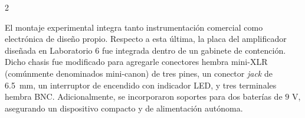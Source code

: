 \documentclass[11pt, letterpaper]{article}
\begin{document}
\begin{multicols*}{2}

El montaje experimental integra tanto instrumentación comercial como electrónica de diseño propio. Respecto a esta última, la placa del amplificador diseñada en Laboratorio 6 \cite{informeLabo6} fue integrada dentro de un gabinete de contención. Dicho chasis fue modificado para agregarle conectores hembra mini-XLR (comúnmente denominados mini-canon) de tres pines, un conector \textit{jack} de 6.5~mm, un interruptor de encendido con indicador LED, y tres terminales hembra BNC. Adicionalmente, se incorporaron soportes para dos baterías de $9$ V, asegurando un dispositivo compacto y de alimentación autónoma.


\end{multicols*}
\end{document}
